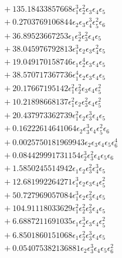 \documentclass[10pt]{article}
\begin{document}
\begin{align*}
&{}  + 135.18433857668 \epsilon_{1}^{3} \epsilon_{2}^{2} \epsilon_{3} \epsilon_{4} \epsilon_{5} \\
&{}  + 0.2703769106844 \epsilon_{2} \epsilon_{3} \epsilon_{4}^{3} \epsilon_{5}^{2} \epsilon_{6} \\
&{}  + 36.89523667253 \epsilon_{1} \epsilon_{2}^{3} \epsilon_{3}^{2} \epsilon_{4} \epsilon_{5} \\
&{}  + 38.045976792813 \epsilon_{1}^{3} \epsilon_{2} \epsilon_{3} \epsilon_{4}^{2} \epsilon_{5} \\
&{}  + 19.049170158746 \epsilon_{1} \epsilon_{2}^{4} \epsilon_{3} \epsilon_{4} \epsilon_{5} \\
&{}  + 38.570717367736 \epsilon_{1}^{4} \epsilon_{2} \epsilon_{3} \epsilon_{4} \epsilon_{5} \\
&{}  + 20.17667195142 \epsilon_{1}^{2} \epsilon_{2}^{2} \epsilon_{3} \epsilon_{4} \epsilon_{5}^{2} \\
&{}  + 10.21898668137 \epsilon_{1}^{2} \epsilon_{2} \epsilon_{3}^{2} \epsilon_{4} \epsilon_{5}^{2} \\
&{}  + 20.437973362739 \epsilon_{1}^{2} \epsilon_{2} \epsilon_{3}^{3} \epsilon_{4} \epsilon_{5} \\
&{}  + 0.16222614641064 \epsilon_{2} \epsilon_{3}^{3} \epsilon_{4} \epsilon_{5}^{2} \epsilon_{6} \\
&{}  + 0.0025750181969943 \epsilon_{2} \epsilon_{3} \epsilon_{4} \epsilon_{5} \epsilon_{6}^{4} \\
&{}  + 0.084429991731154 \epsilon_{2}^{3} \epsilon_{3}^{2} \epsilon_{4} \epsilon_{5} \epsilon_{6} \\
&{}  + 1.5850245514942 \epsilon_{1} \epsilon_{2} \epsilon_{3}^{2} \epsilon_{4}^{3} \epsilon_{5} \\
&{}  + 12.681992264271 \epsilon_{1}^{3} \epsilon_{2} \epsilon_{3} \epsilon_{4} \epsilon_{5}^{2} \\
&{}  + 50.727969057084 \epsilon_{1}^{3} \epsilon_{2} \epsilon_{3}^{2} \epsilon_{4} \epsilon_{5} \\
&{}  + 104.91118033629 \epsilon_{1}^{2} \epsilon_{2}^{2} \epsilon_{3}^{2} \epsilon_{4} \epsilon_{5} \\
&{}  + 6.6887211691035 \epsilon_{1} \epsilon_{2}^{3} \epsilon_{3} \epsilon_{4} \epsilon_{5}^{2} \\
&{}  + 6.8501860151068 \epsilon_{1} \epsilon_{2}^{2} \epsilon_{3}^{3} \epsilon_{4} \epsilon_{5} \\
&{}  + 0.054075382136881 \epsilon_{2} \epsilon_{3}^{3} \epsilon_{4} \epsilon_{5} \epsilon_{6}^{2} \\

\end{align*}
\end{document}
